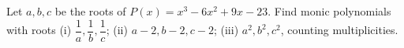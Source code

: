 Let $a,b,c$ be the roots of $P(x)=x^3-6x^2+9x-23$. Find monic polynomials with roots (i) $\dfrac{1}{a},\dfrac{1}{b},\dfrac{1}{c}$; (ii) $a-2,b-2,c-2$; (iii) $a^2,b^2,c^2$, counting multiplicities.
